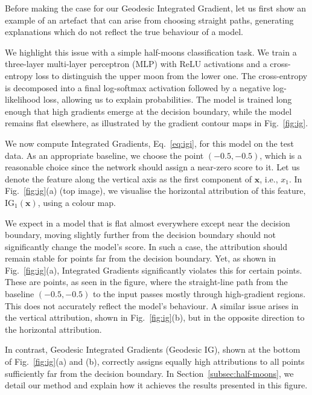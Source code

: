 Before making the case for our Geodesic Integrated Gradient, let us first show an example of an artefact that can arise from choosing straight paths, generating explanations which do not reflect the true behaviour of a model. 

We highlight this issue with a simple half-moons classification task. We train a three-layer multi-layer perceptron (MLP) with ReLU activations and a cross-entropy loss to distinguish the upper moon from the lower one. The cross-entropy is decomposed into a final log-softmax activation followed by a negative log-likelihood loss, allowing us to explain probabilities. The model is trained long enough that high gradients emerge at the decision boundary, while the model remains flat elsewhere, as illustrated by the gradient contour maps in Fig.~\ref{fig:ig}.  

We now compute Integrated Gradients, Eq.~\ref{eq:igi}, for this model on the test data. As an appropriate baseline, we choose the point $(-0.5, -0.5)$, which is a reasonable choice since the network should assign a near-zero score to it. Let us denote the feature along the vertical axis as the first component of $\mathbf{x}$, i.e., $x_1$. In Fig.~\ref{fig:ig}(a) (top image), we visualise the horizontal attribution of this feature, $\text{IG}_1(\mathbf{x})$, using a colour map. 

We expect in a model that is flat almost everywhere except near the decision boundary, moving slightly further from the decision boundary should not significantly change the model’s score. In such a case, the attribution should remain stable for points far from the decision boundary. Yet, as shown in Fig.~\ref{fig:ig}(a), Integrated Gradients significantly violates this for certain points. These are points, as seen in the figure, where the straight-line path from the baseline $(-0.5, -0.5)$ to the input passes mostly through high-gradient regions. This does not accurately reflect the model's behaviour. A similar issue arises in the vertical attribution, shown in Fig.~\ref{fig:ig}(b), but in the opposite direction to the horizontal attribution.  

In contrast, Geodesic Integrated Gradients (Geodesic IG), shown at the bottom of Fig.~\ref{fig:ig}(a) and (b), correctly assigns equally high attributions to all points sufficiently far from the decision boundary. In Section~\ref{subsec:half-moons}, we detail our method and explain how it achieves the results presented in this figure.  


